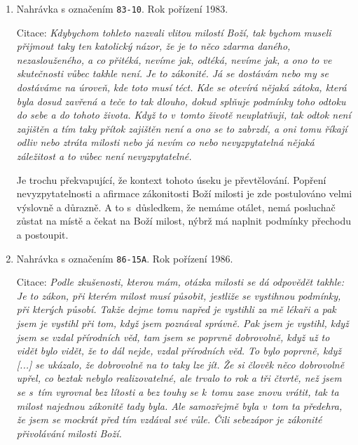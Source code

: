 \begin{enumerate}
{    Variace na předchozí výroky, kde se milost Boží podmiňuje zákonitostí.
    V~tomto případě se hovoří o svolení ze strany člověka.
  }
  \item{
    Nahrávka s označením \texttt{83-10}.
    Rok pořízení 1983.

    Citace: \textit{%
      Kdybychom tohleto nazvali vlitou milostí Boží, tak bychom museli přijmout
      taky ten katolický názor, že je to něco zdarma daného, nezaslouženého, a
      co přitéká, nevíme jak, odtéká, nevíme jak, a ono to ve skutečnosti vůbec
      takhle není. Je to zákonité. Já se dostávám nebo my se dostáváme na
      úroveň, kde toto musí téct. Kde se otevírá nějaká zátoka, která byla dosud
      zavřená a teče to tak dlouho, dokud splňuje podmínky toho odtoku do sebe a
      do tohoto života. Když to v~tomto životě neuplatňuji, tak odtok není
      zajištěn a tím taky přítok zajištěn není a ono se to zabrzdí, a oni tomu
      říkají odliv nebo ztráta milosti nebo já nevím co nebo nevyzpytatelná
      nějaká záležitost a to vůbec není nevyzpytatelné.
    }

    Je trochu překvapující, že kontext tohoto úseku je převtělování. Popření
    nevyzpytatelnosti a afirmace zákonitosti Boží milosti je zde postulováno
    velmi výslovně a důrazně. A to s~důsledkem, že nemáme otálet, nemá
    posluchač zůstat na místě a čekat na Boží milost, nýbrž má naplnit podmínky
    přechodu a postoupit.
  }
  \item{
    Nahrávka s označením \texttt{86-15A}.
    Rok pořízení 1986.

    Citace: \textit{%
      Podle zkušenosti, kterou mám, otázka milosti se dá odpovědět takhle: Je to
      zákon, při kterém milost musí působit, jestliže se vystihnou podmínky, při
      kterých působí. Takže dejme tomu napřed je vystihli za mě lékaři a pak
      jsem je vystihl při tom, když jsem poznával správně. Pak jsem je vystihl,
      když jsem se vzdal přírodních věd, tam jsem se poprvně dobrovolně, když už
      to vidět bylo vidět, že to dál nejde, vzdal přírodních věd. To bylo
      poprvně, když [...] se ukázalo, že dobrovolně na to taky lze jít. Že si
      člověk něco dobrovolně upřel, co beztak nebylo realizovatelné, ale trvalo
      to rok a tři čtvrtě, než jsem se s~tím vyrovnal bez lítosti a bez touhy se
      k~tomu zase znovu vrátit, tak ta milost najednou zákonitě tady byla. Ale
      samozřejmě byla v~tom ta předehra, že jsem se mockrát před tím vzdával své
      vůle. Čili sebezápor je zákonité přivolávání milosti Boží.
    }

}
\end{enumerate}
